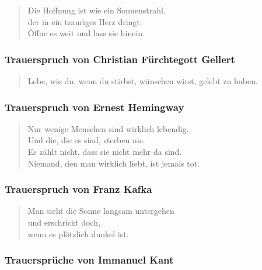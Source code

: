 \documentclass[ngerman,a4paper,11pt]{scrreprt}
\begin{document}
\begin{verse}
Die Hoffnung ist wie ein Sonnenstrahl, \\
der in ein trauriges Herz dringt. \\
Öffne es weit und lass sie hinein. \\
\end{verse}

\subsubsection*{Trauerspruch von Christian Fürchtegott Gellert}
\label{sec-2-1-2-3-9}

\begin{verse}
Lebe, wie du, wenn du stirbst, wünschen wirst, gelebt zu haben. \\
\end{verse}

\subsubsection*{Trauerspruch von Ernest Hemingway}
\label{sec-2-1-2-3-10}

\begin{verse}
Nur wenige Menschen sind wirklich lebendig. \\
Und die, die es sind, sterben nie. \\
Es zählt nicht, dass sie nicht mehr da sind. \\
Niemand, den man wirklich liebt, ist jemals tot. \\
\end{verse}

\subsubsection*{Trauerspruch von Franz Kafka}
\label{sec-2-1-2-3-11}

\begin{verse}
Man sieht die Sonne langsam untergehen \\
und erschrickt doch, \\
wenn es plötzlich dunkel ist. \\
\end{verse}

\subsubsection*{Trauersprüche von Immanuel Kant}
\label{sec-2-1-2-3-12}
\end{document}
